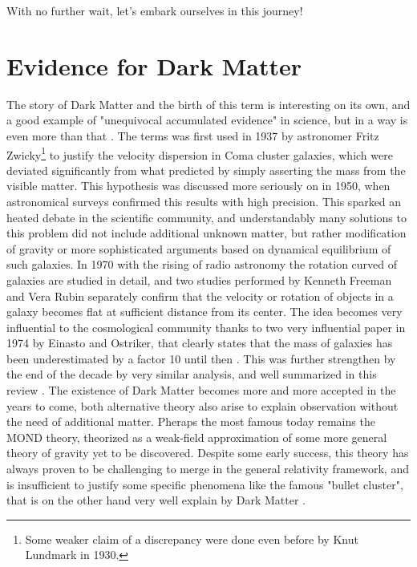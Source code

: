 With no further wait, let's embark ourselves in this journey!


\section{Evidence for Dark Matter}
\label{ch1:sec:dm-evidence}

The story of Dark Matter and the birth of this term is interesting on its own, and a good example of "unequivocal accumulated evidence" in science, but in a way is even more than that \cite{hooper, deSwart:2017heh}. The terms was first used in 1937 by astronomer Fritz Zwicky\footnote{Some weaker claim of a discrepancy were done even before by Knut Lundmark in 1930.} to justify the velocity dispersion in Coma cluster galaxies, which were deviated significantly from what predicted by simply asserting the mass from the visible matter. This hypothesis was discussed more seriously on in 1950, when astronomical surveys confirmed this results with high precision. This sparked an heated debate in the scientific community, and understandably many solutions to this problem did not include additional unknown matter, but rather modification of gravity or more sophisticated arguments based on dynamical equilibrium of such galaxies. In 1970 with the rising of radio astronomy the rotation curved of galaxies are studied in detail, and two studies performed by Kenneth Freeman and Vera Rubin separately confirm that the velocity or rotation of objects in a galaxy becomes flat at sufficient distance from its center. The idea becomes very influential to the cosmological community thanks to two very influential paper in 1974 by Einasto and Ostriker, that clearly states that the mass of galaxies has been underestimated by a factor 10 until then \cite{EINASTO1974,1974ApJ...193L...1O}. This was further strengthen by the end of the decade by very similar analysis, and well summarized in this review \cite{annurev.aa.17.090179.001031}. The existence of Dark Matter becomes more and more accepted in the years to come, both alternative theory also arise to explain observation without the need of additional matter. Pheraps the most famous today remains the MOND theory, theorized as a weak-field approximation of some more general theory of gravity yet to be discovered. Despite some early success, this theory has always proven to be challenging to merge in the general relativity framework, and is insufficient to justify some specific phenomena like the famous "bullet cluster", that is on the other hand very well explain by Dark Matter \cite{Clowe_2006}.

